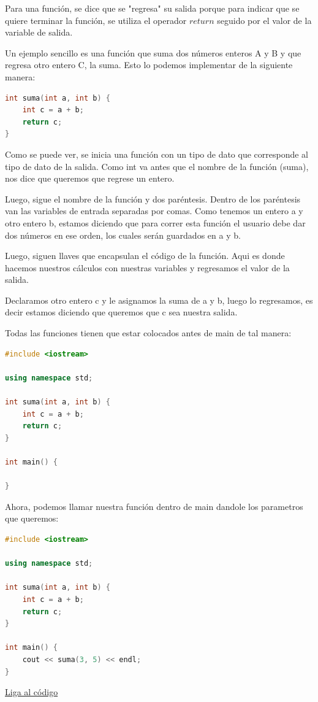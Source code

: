 \documentclass{article}
\begin{document}
Para una función, se dice que se "regresa" su salida porque para indicar que se quiere terminar la función, se utiliza el operador $return$ seguido por el valor de la variable de salida.

Un ejemplo sencillo es una función que suma dos números enteros A y B y que regresa otro entero C, la suma. Esto lo podemos implementar de la siguiente manera:

\begin{lstlisting}[language=C++, title=Función de suma]
int suma(int a, int b) {
	int c = a + b;
	return c;
}
\end{lstlisting}

Como se puede ver, se inicia una función con un tipo de dato que corresponde al tipo de dato de la salida. Como int va antes que el nombre de la función (suma), nos dice que queremos que regrese un entero.

Luego, sigue el nombre de la función y dos paréntesis. Dentro de los paréntesis van las variables de entrada separadas por comas. Como tenemos un entero a y otro entero b, estamos diciendo que para correr esta función el usuario debe dar dos números en ese orden, los cuales serán guardados en a y b.

Luego, siguen llaves que encapsulan el código de la función. Aqui es donde hacemos nuestros cálculos con nuestras variables y regresamos el valor de la salida.

Declaramos otro entero c y le asignamos la suma de a y b, luego lo regresamos, es decir estamos diciendo que queremos que c sea nuestra salida.

Todas las funciones tienen que estar colocados antes de main de tal manera:

\begin{lstlisting}[language=C++, title=Función de suma]
#include <iostream>

using namespace std;

int suma(int a, int b) {
	int c = a + b;
	return c;
}

int main() {

}
\end{lstlisting}

Ahora, podemos llamar nuestra función dentro de main dandole los parametros que queremos:

\begin{lstlisting}[language=C++, title=Función de suma]
#include <iostream>

using namespace std;

int suma(int a, int b) {
	int c = a + b;
	return c;
}

int main() {
	cout << suma(3, 5) << endl;
}
\end{lstlisting}
\href{https://repl.it/@Jamesscn/Funciones}{Liga al código}\\
\end{document}
